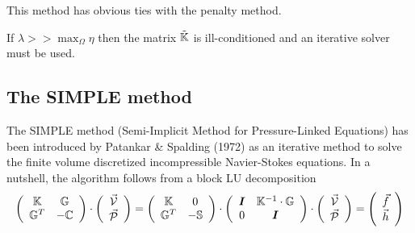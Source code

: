 \begin{remark} 
This method has obvious ties with the penalty method. 
\end{remark}

\begin{remark} 
If $\lambda >> \max_\Omega{\eta}$ then the matrix $\tilde{{\mathbb{K}}}$ is ill-conditioned and an iterative solver must be used.
\end{remark}

\subsection{The SIMPLE method}

The SIMPLE method (Semi-Implicit Method for Pressure-Linked Equations)
has been introduced by Patankar \& Spalding (1972) \cite{pasp72} as an iterative method to solve
the finite volume discretized incompressible Navier-Stokes equations. 
In a nutshell, the algorithm follows from a block LU decomposition
\begin{equation}
\left(
\begin{array}{cc}
{\mathbb{K}} & {\mathbb{G}} \\ {\mathbb{G}}^T & -{\mathbb{C}} 
\end{array}
\right)
\cdot
\left(
\begin{array}{c}
\vec{\cal V} \\ \vec{\cal P}
\end{array}
\right)
=
\left(
\begin{array}{cc}
{\mathbb{K}} & 0 \\ 
{\mathbb{G}}^T & -{\mathbb{S}}
\end{array}
\right)
\cdot
\left(
\begin{array}{cc}
{\bm I} & {\mathbb{K}}^{-1} \cdot {\mathbb{G}} \\
0 & {\bm I} 
\end{array}
\right)
\cdot
\left(
\begin{array}{c}
\vec{\cal V} \\ \vec{\cal P}
\end{array}
\right)
=
\left(
\begin{array}{c}
\vec{f} \\ \vec{h}
\end{array}
\right)
\end{equation}
